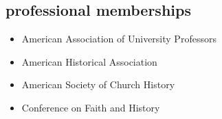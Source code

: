\documentclass[11pt]{article}
\providecommand{\tightlist}{%
  \setlength{\itemsep}{0pt}\setlength{\parskip}{0pt}}
\begin{document}


\subsection{professional memberships}\label{professional-memberships}

\begin{itemize}
    \tightlist
    \item American Association of University Professors
    \item American Historical Association
    \item American Society of Church History
    \item Conference on Faith and History
\end{itemize}
\end{document}
